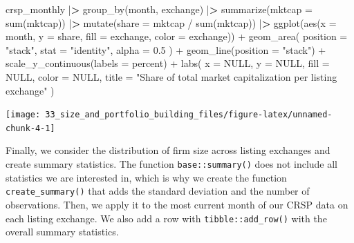 \documentclass[
]{book}
\newenvironment{Shaded}{\begin{snugshade}}{\end{snugshade}}
\newcommand{\AttributeTok}[1]{\textcolor[rgb]{0.61,0.61,0.61}{#1}}
\newcommand{\ConstantTok}[1]{\textcolor[rgb]{0,0,0}{#1}}
\newcommand{\ErrorTok}[1]{\textcolor[rgb]{0.14,0.14,0.14}{\textbf{#1}}}
\newcommand{\FloatTok}[1]{\textcolor[rgb]{0.06,0.06,0.06}{#1}}
\newcommand{\FunctionTok}[1]{\textcolor[rgb]{0,0,0}{#1}}
\newcommand{\NormalTok}[1]{#1}
\newcommand{\SpecialCharTok}[1]{\textcolor[rgb]{0,0,0}{#1}}
\newcommand{\StringTok}[1]{\textcolor[rgb]{0.5,0.5,0.5}{#1}}
\begin{document}
\begin{Shaded}
\begin{Highlighting}[]
\NormalTok{crsp\_monthly }\SpecialCharTok{|}\ErrorTok{\textgreater{}}
  \FunctionTok{group\_by}\NormalTok{(month, exchange) }\SpecialCharTok{|}\ErrorTok{\textgreater{}}
  \FunctionTok{summarize}\NormalTok{(}\AttributeTok{mktcap =} \FunctionTok{sum}\NormalTok{(mktcap)) }\SpecialCharTok{|}\ErrorTok{\textgreater{}}
  \FunctionTok{mutate}\NormalTok{(}\AttributeTok{share =}\NormalTok{ mktcap }\SpecialCharTok{/} \FunctionTok{sum}\NormalTok{(mktcap)) }\SpecialCharTok{|}\ErrorTok{\textgreater{}}
  \FunctionTok{ggplot}\NormalTok{(}\FunctionTok{aes}\NormalTok{(}\AttributeTok{x =}\NormalTok{ month, }\AttributeTok{y =}\NormalTok{ share, }\AttributeTok{fill =}\NormalTok{ exchange, }\AttributeTok{color =}\NormalTok{ exchange)) }\SpecialCharTok{+}
  \FunctionTok{geom\_area}\NormalTok{(}
    \AttributeTok{position =} \StringTok{"stack"}\NormalTok{,}
    \AttributeTok{stat =} \StringTok{"identity"}\NormalTok{,}
    \AttributeTok{alpha =} \FloatTok{0.5}
\NormalTok{  ) }\SpecialCharTok{+}
  \FunctionTok{geom\_line}\NormalTok{(}\AttributeTok{position =} \StringTok{"stack"}\NormalTok{) }\SpecialCharTok{+}
  \FunctionTok{scale\_y\_continuous}\NormalTok{(}\AttributeTok{labels =}\NormalTok{ percent) }\SpecialCharTok{+}
  \FunctionTok{labs}\NormalTok{(}
    \AttributeTok{x =} \ConstantTok{NULL}\NormalTok{, }\AttributeTok{y =} \ConstantTok{NULL}\NormalTok{, }\AttributeTok{fill =} \ConstantTok{NULL}\NormalTok{, }\AttributeTok{color =} \ConstantTok{NULL}\NormalTok{,}
    \AttributeTok{title =} \StringTok{"Share of total market capitalization per listing exchange"}
\NormalTok{  )}
\end{Highlighting}
\end{Shaded}

\begin{center}\texttt{[image: 33\_size\_and\_portfolio\_building\_files/figure-latex/unnamed-chunk-4-1]} \end{center}

Finally, we consider the distribution of firm size across listing exchanges and create summary statistics. The function \texttt{base::summary()} does not include all statistics we are interested in, which is why we create the function \texttt{create\_summary()} that adds the standard deviation and the number of observations. Then, we apply it to the most current month of our CRSP data on each listing exchange. We also add a row with \texttt{tibble::add\_row()} with the overall summary statistics.
\end{document}
